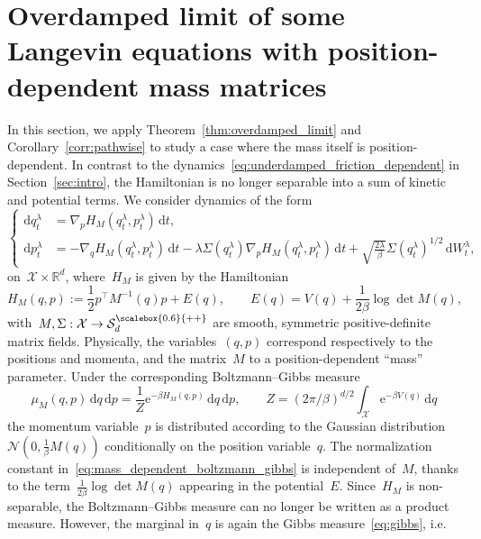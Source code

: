 \documentclass[10pt]{article}
\renewcommand{\d}{\mathrm{d}}
\newcommand{\e}{\mathrm{e}}
\newcommand{\R}{\mathbb{R}}
\newcommand{\cX}{\mathcal{X}}
\newcommand{\cSpd}{\mathcal{S}_d^{\scalebox{0.6}{++}}}
\newcommand{\1}{\mathbbm 1}
\begin{document}
\section{Overdamped limit of some Langevin equations with position-dependent mass matrices}
\label{sec:mass_matrices}
In this section, we apply Theorem~\ref{thm:overdamped_limit} and Corollary~\ref{corr:pathwise} to study a case where the mass itself is position-dependent. In contrast to the dynamics~\eqref{eq:underdamped_friction_dependent} in Section~\ref{sec:intro}, the Hamiltonian is no longer separable into a sum of kinetic and potential terms.
We consider dynamics of the form
\begin{equation}
    \label{eq:general_langevin}
    \left\{\begin{aligned}
    \d q_t^\lambda &= \nabla_p H_M(q_t^\lambda,p_t^\lambda)\,\d t,\\
    \d p_t^\lambda &= -\nabla_q H_M(q_t^\lambda,p_t^\lambda)\,\d t -\lambda\Sigma(q_t^\lambda)\nabla_p H_M(q_t^\lambda,p_t^\lambda)\,\d t + \sqrt{\frac{2\lambda}{\beta}}\Sigma(q_t^\lambda)^{1/2}\,\d W_t^\lambda,
    \end{aligned}\right.
\end{equation}
on~$\cX\times\R^d$, where~$H_M$ is given by the Hamiltonian
\begin{equation}
    \label{eq:modified_hamiltonian}
    H_M(q,p) := \frac12 p^\top M^{-1}(q) p + E(q),\qquad E(q)=V(q) +\frac1{2\beta} \log\det M(q),
\end{equation}
with~$M,\Sigma:\cX\to\cSpd$ are smooth, symmetric positive-definite matrix fields. Physically, the variables~$(q,p)$ correspond respectively to the positions and momenta, and the matrix~$M$ to a position-dependent ``mass'' parameter. Under the corresponding Boltzmann--Gibbs measure
\begin{equation}
    \label{eq:mass_dependent_boltzmann_gibbs}
    \mu_M(q,p)\,\d q\,\d p = \frac1{Z}\e^{-\beta H_M(q,p)}\,\d q\,\d p,\qquad Z = (2\pi/\beta)^{d/2}\int_{\cX} \e^{-\beta V(q)}\,\d q
\end{equation}
the momentum variable~$p$ is distributed according to the Gaussian distribution~$\mathcal N\left(0,\frac{1}{\beta}M(q)\right)$ conditionally on the position variable~$q$.
The normalization constant in~\eqref{eq:mass_dependent_boltzmann_gibbs} is independent of~$M$, thanks to the term~$\frac1{2\beta}\log\det M(q)$ appearing in the potential~$E$.
Since~$H_M$ is non-separable, the Boltzmann--Gibbs measure can no longer be written as a product measure. However, the marginal in~$q$ is again the Gibbs measure~\eqref{eq:gibbs}, i.e.
\end{document}
